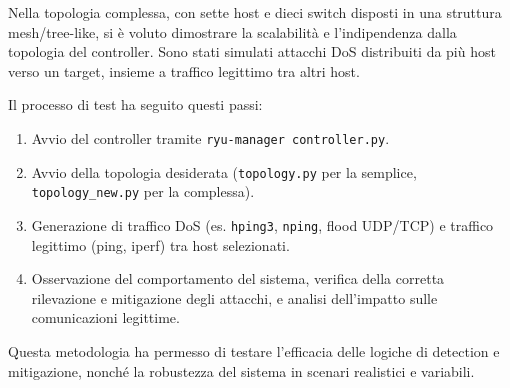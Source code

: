 Nella topologia complessa, con sette host e dieci switch disposti in una struttura mesh/tree-like, si è voluto dimostrare la scalabilità e l’indipendenza dalla topologia del controller. Sono stati simulati attacchi DoS distribuiti da più host verso un target, insieme a traffico legittimo tra altri host.

Il processo di test ha seguito questi passi:
\begin{enumerate}
    \item Avvio del controller tramite \texttt{ryu-manager controller.py}.
    \item Avvio della topologia desiderata (\texttt{topology.py} per la semplice, \texttt{topology\_new.py} per la complessa).
    \item Generazione di traffico DoS (es. \texttt{hping3}, \texttt{nping}, flood UDP/TCP) e traffico legittimo (ping, iperf) tra host selezionati.
    \item Osservazione del comportamento del sistema, verifica della corretta rilevazione e mitigazione degli attacchi, e analisi dell’impatto sulle comunicazioni legittime.
\end{enumerate}

Questa metodologia ha permesso di testare l’efficacia delle logiche di detection e mitigazione, nonché la robustezza del sistema in scenari realistici e variabili.
